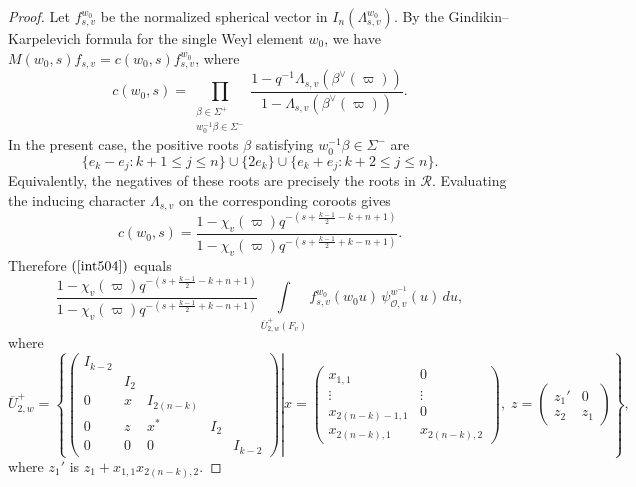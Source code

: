 \documentclass[11pt,notitlepage]{amsart}
\theoremstyle{definition}
\theoremstyle{remark}
\newcommand{\calO}{\mathcal{O}}
\begin{document}
\begin{proof}
Let \(f^{w_0}_{s,v}\) be the normalized spherical vector in
\(I_n(\Lambda_{s,v}^{w_0})\). By the Gindikin--Karpelevich formula for the
single Weyl element \(w_0\), we have $M(w_0,s)f_{s,v}
=
c(w_0,s)f^{w_0}_{s,v}$, where
\[
c(w_0,s)
=
\prod_{\substack{\beta\in\Sigma^+\\ w_0^{-1}\beta\in\Sigma^-}}
\frac{
1-q^{-1}\Lambda_{s,v}(\beta^\vee(\varpi))
}{
1-\Lambda_{s,v}(\beta^\vee(\varpi))
}.
\]
In the present case, the positive roots \(\beta\) satisfying
\(w_0^{-1}\beta\in\Sigma^-\) are
\[
\{e_k-e_j:k+1\le j\le n\}
\cup
\{2e_k\}
\cup
\{e_k+e_j:k+2\le j\le n\}.
\]
Equivalently, the negatives of these roots are precisely the roots in
\(\mathcal R\). Evaluating the inducing character \(\Lambda_{s,v}\) on the
corresponding coroots gives
\[
c(w_0,s)
=
\frac{
1-\chi_v(\varpi)q^{-\left(s+\frac{k-1}{2}-k+n+1\right)}
}{
1-\chi_v(\varpi)q^{-\left(s+\frac{k-1}{2}+k-n+1\right)}
}.
\]
Therefore \((\ref{int504})\) equals
\begin{equation}\label{int507}
  \frac{
  1-\chi_v(\varpi)q^{-\left(s+\frac{k-1}{2}-k+n+1\right)}
  }{
  1-\chi_v(\varpi)q^{-\left(s+\frac{k-1}{2}+k-n+1\right)}
  }
  \int\limits_{\overline{U}^{+}_{2,w}(F_v)}
  f^{w_0}_{s,v}(w_0u)\,
  \psi^{w^{-1}}_{\calO,v}(u)\,du,
\end{equation}
where
\begin{equation}\label{uz}
  \overline{U}^{+}_{2,w} = \left\{\left.\begin{pmatrix} 
    I_{k-2}&&&&\\
    &I_2&&&\\
    0&x&I_{2(n-k)}&&\\
    0&z&x^\ast&I_2&\\
    0&0&0&&I_{k-2}
  \end{pmatrix}\right\vert
    x = \begin{pmatrix}
      x_{1,1}&0\\
      \vdots&\vdots\\
      x_{2(n-k)-1,1}&0\\
      x_{2(n-k),1}&x_{2(n-k),2}
    \end{pmatrix},\;
    z= \begin{pmatrix}
      z_1'&0\\z_2&z_1
    \end{pmatrix}
  \right\},
\end{equation}
where $z_1'$ is $z_1+x_{1,1}x_{2(n-k),2}$.


\end{proof}
\end{document}

